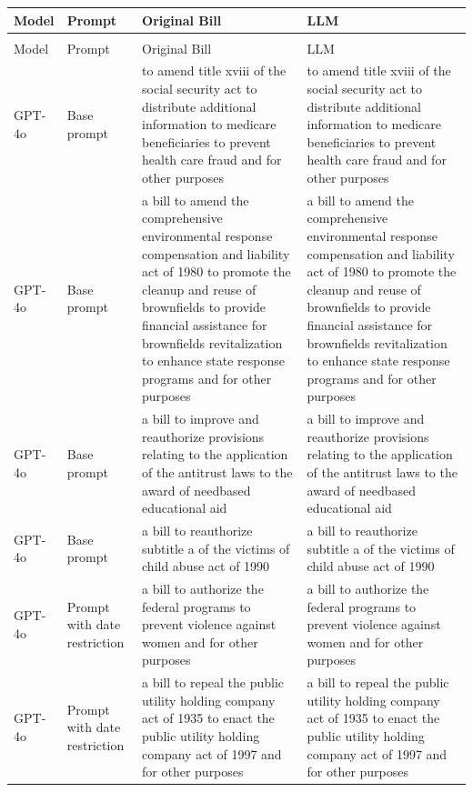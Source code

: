 
\begin{longtable}{>{\raggedright\arraybackslash}p{1.4cm}>{\raggedright\arraybackslash}p{1.4cm}>{\raggedright\arraybackslash}p{5.5cm}>{\raggedright\arraybackslash}p{5.5cm}}
\toprule
Model & Prompt & Original Bill & LLM\\
\midrule
\endfirsthead
\multicolumn{4}{@{}l}{\textit{(continued)}}\\
\toprule
Model & Prompt & Original Bill & LLM\\
\midrule
\endhead

\endfoot
\bottomrule
\endlastfoot
GPT-4o & Base prompt & to amend title xviii of the social security act to distribute additional information to medicare beneficiaries to prevent health care fraud and for other purposes & to amend title xviii of the social security act to distribute additional information to medicare beneficiaries to prevent health care fraud and for other purposes\\
GPT-4o & Base prompt & a bill to amend the comprehensive environmental response compensation and liability act of 1980 to promote the cleanup and reuse of brownfields to provide financial assistance for brownfields revitalization to enhance state response programs and for other purposes & a bill to amend the comprehensive environmental response compensation and liability act of 1980 to promote the cleanup and reuse of brownfields to provide financial assistance for brownfields revitalization to enhance state response programs and for other purposes\\
GPT-4o & Base prompt & a bill to improve and reauthorize provisions relating to the application of the antitrust laws to the award of needbased educational aid & a bill to improve and reauthorize provisions relating to the application of the antitrust laws to the award of needbased educational aid\\
GPT-4o & Base prompt & a bill to reauthorize subtitle a of the victims of child abuse act of 1990 & a bill to reauthorize subtitle a of the victims of child abuse act of 1990\\
GPT-4o & Prompt with date restriction & a bill to authorize the federal programs to prevent violence against women and for other purposes & a bill to authorize the federal programs to prevent violence against women and for other purposes\\
GPT-4o & Prompt with date restriction & a bill to repeal the public utility holding company act of 1935 to enact the public utility holding company act of 1997 and for other purposes & a bill to repeal the public utility holding company act of 1935 to enact the public utility holding company act of 1997 and for other purposes\\

\end{longtable}
